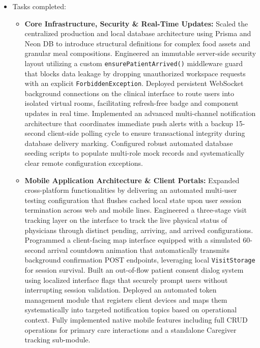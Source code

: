 \documentclass[onecolumn,journal]{IEEEtran}
\begin{document}
	\begin{itemize}
		
		\item Tasks completed:
		\begin{itemize}
			\item \textbf{Core Infrastructure, Security \& Real-Time Updates:} Scaled the centralized production and local database architecture using Prisma and Neon DB to introduce structural definitions for complex food assets and granular meal compositions. Engineered an immutable server-side security layout utilizing a custom \texttt{ensure\-Patient\-Arrived()} middleware guard \cite{androutsellis2004middleware} that blocks data leakage by dropping unauthorized workspace requests with an explicit \texttt{Forbidden\-Exception}. Deployed persistent WebSocket background connections \cite{fette2011websocket} on the clinical interface to route users into isolated virtual rooms, facilitating refresh-free badge and component updates in real time. Implemented an advanced multi-channel notification architecture that coordinates immediate push alerts with a backup 15-second client-side polling cycle to ensure transactional integrity during database delivery marking. Configured robust automated database seeding scripts to populate multi-role mock records and systematically clear remote configuration exceptions.
			
			\item \textbf{Mobile Application Architecture \& Client Portals:} Expanded cross-platform functionalities by delivering an automated multi-user testing configuration that flushes cached local state upon user session termination across web and mobile lines. Engineered a three-stage visit tracking layer on the interface to track the live physical status of physicians through distinct pending, arriving, and arrived configurations. Programmed a client-facing map interface equipped with a simulated 60-second arrival countdown animation that automatically transmits background confirmation POST endpoints, leveraging local \texttt{VisitStorage} for session survival. Built an out-of-flow patient consent dialog system using localized interface flags that securely prompt users without interrupting session validation. Deployed an automated token management module that registers client devices and maps them systematically into targeted notification topics based on operational context. Fully implemented native mobile features including full CRUD operations for primary care interactions and a standalone Caregiver tracking sub-module.
			

\end{itemize}
\end{itemize}
\end{document}
